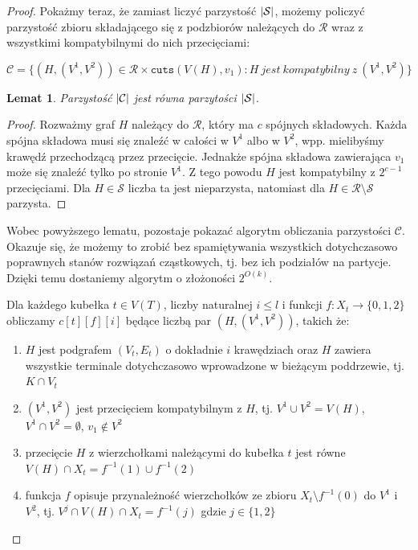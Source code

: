 \documentclass[12pt, oneside]{report}
\newtheorem{lemma}{Lemat}
\newcommand\Omicron{O}
\begin{document}
\begin{proof}
Pokażmy teraz, że zamiast liczyć parzystość $\abs{\mathcal{S}}$, możemy policzyć parzystość zbioru składającego się z podzbiorów należących do $\mathcal{R}$ wraz z wszystkimi kompatybilnymi do nich przecięciami:

$$\mathcal{C} = \{(H, (V^1, V^2)) \in \mathcal{R} \times \texttt{cuts}(V(H), v_1) : H\ jest\ kompatybilny\ z\ (V^1, V^2)\}$$

\begin{lemma}
Parzystość $\abs{\mathcal{C}}$ jest równa parzytości $\abs{\mathcal{S}}$.
\end{lemma}

\begin{proof}
Rozważmy graf $H$ należący do $\mathcal{R}$, który ma $c$ spójnych składowych. Każda spójna składowa musi się znaleźć w całości w $V^1$ albo w $V^2$, wpp. mielibyśmy krawędź przechodzącą przez przecięcie. Jednakże spójna składowa zawierająca $v_1$ może się znaleźć tylko po stronie $V^1$. Z tego powodu $H$ jest kompatybilny z $2^{c-1}$ przecięciami. Dla $H \in \mathcal{S}$ liczba ta jest nieparzysta, natomiast dla $H \in \mathcal{R} \setminus \mathcal{S}$ parzysta. 
\end{proof}

Wobec powyższego lematu, pozostaje pokazać algorytm obliczania parzystości $\mathcal{C}$. Okazuje się, że możemy to zrobić bez spamiętywania wszystkich dotychczasowo poprawnych stanów rozwiązań cząstkowych, tj. bez ich podziałów na partycje. Dzięki temu dostaniemy algorytm o złożoności $2^{\Omicron(k)}$.

Dla każdego kubełka $t \in V(T)$, liczby naturalnej $i \leq l$ i funkcji $f: X_t \to \{0,1,2\}$ obliczamy $c[t][f][i]$ będące liczbą par $(H, (V^1, V^2))$, takich że:

\begin{enumerate}
\item $H$ jest podgrafem $(V_t, E_t)$ o dokładnie $i$ krawędziach oraz $H$ zawiera wszystkie terminale dotychczasowo wprowadzone w bieżącym poddrzewie, tj. $K \cap V_t$
\item $(V^1, V^2)$ jest przecięciem kompatybilnym z $H$, tj. $V^1 \cup V^2 = V(H)$, $V^1 \cap V^2 = \emptyset$, $v_1 \notin V^2$
\item przecięcie $H$ z wierzchołkami należącymi do kubełka $t$ jest równe $V(H) \cap X_t = f^{-1}(1) \cup f^{-1}(2)$
\item funkcja $f$ opisuje przynależność wierzchołków ze zbioru $X_t \setminus f^{-1}(0)$ do $V^1$ i $V^2$, tj. $V^j \cap V(H) \cap X_t = f^{-1}(j)$ gdzie $j \in \{1,2\}$
\end{enumerate} 


\end{proof}
\end{document}
